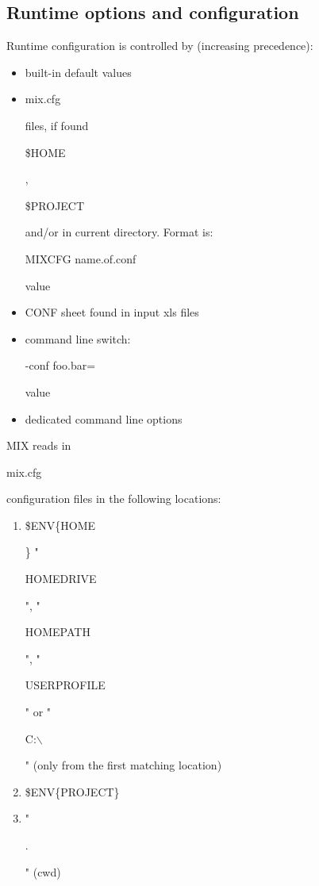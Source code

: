 \documentclass[a4paper,12pt]{article}
\begin{document}
\subsection{Runtime options and configuration}
Runtime configuration is controlled by (increasing precedence):
\begin{itemize}
\item built-in default values
\item \begin{tt}mix.cfg\end{tt} files, if found \begin{tt}\$HOME\end{tt}, \begin{tt}\$PROJECT\end{tt} and/or in current directory. Format is: \begin{tt}MIXCFG name.of.conf\end{tt} \begin{it}value\end{it}
\item CONF sheet found in input xls files
\item command line switch: \begin{tt}-conf foo.bar=\end{tt}\begin{it}value\end{it}
\item dedicated command line options
\end{itemize}
MIX reads in \begin{tt}mix.cfg\end{tt} configuration files in the following locations:
\begin{enumerate}
\item{\begin{tt}\$ENV\{HOME\end{tt}\}\newline
"\begin{tt}HOMEDRIVE\end{tt}", "\begin{tt}HOMEPATH\end{tt}", "\begin{tt}USERPROFILE\end{tt}" or "\begin{tt}C:$\backslash$\end{tt}"\newline
(only from the first matching location)}\newline
\item{\begin{tt}\$ENV\{PROJECT\}\end{tt}}
\item{"\begin{tt}.\end{tt}" (cwd)}
\end{enumerate}
\end{document}
